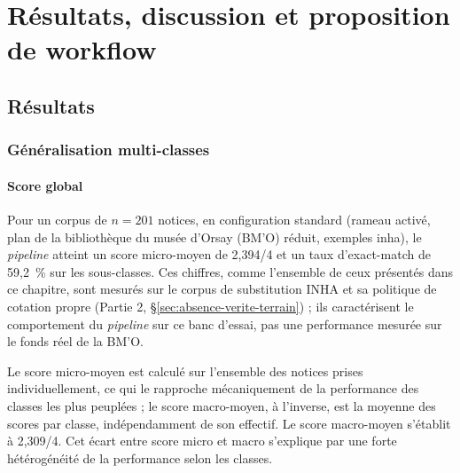 
\chapter{Résultats, discussion et proposition de workflow}
\label{chap:partie3}


\section{Résultats}
\label{sec:resultats}

\subsection{Généralisation multi-classes}
\label{sec:generalisation-multiclasses}

\subsubsection*{Score global}
\label{sec:score-global}

Pour un corpus de $n = 201$ notices, en configuration standard (\gls{rameau} activé, plan de la bibliothèque du musée d'Orsay (BM'O) réduit, exemples \gls{inha}), le \textit{pipeline} atteint un score micro-moyen de 2,394/4 et un taux d'exact-match de 59,2~\% sur les sous-classes. Ces chiffres, comme l'ensemble de ceux présentés dans ce chapitre, sont mesurés sur le corpus de substitution INHA et sa politique de cotation propre (Partie 2, §\ref{sec:absence-verite-terrain}) ; ils caractérisent le comportement du \textit{pipeline} sur ce banc d'essai, pas une performance mesurée sur le fonds réel de la BM'O.

Le score micro-moyen est calculé sur l'ensemble des notices prises individuellement, ce qui le rapproche mécaniquement de la performance des classes les plus peuplées ; le score macro-moyen, à l'inverse, est la moyenne des scores par classe, indépendamment de son effectif. Le score macro-moyen s'établit à 2,309/4. Cet écart entre score micro et macro s'explique par une forte hétérogénéité de la performance selon les classes.


